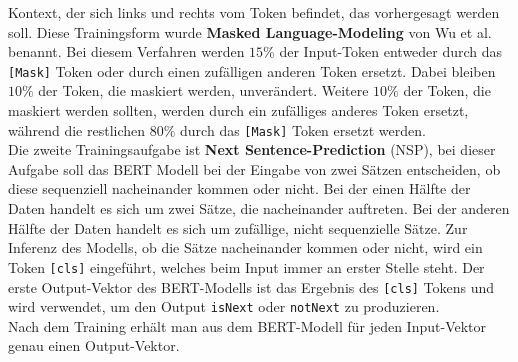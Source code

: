 \documentclass[12pt,letterpaper,ngerman]{article}
\begin{document}
Kontext, der sich links und rechts vom Token befindet, das vorhergesagt
werden soll.
Diese Trainingsform wurde {\bf Masked Language-Modeling} von 
Wu et al. benannt.
Bei diesem Verfahren werden $15 \%$ der Input-Token entweder durch 
das \verb|[Mask]| Token oder durch einen zufälligen anderen 
Token ersetzt.
Dabei bleiben $10 \%$ der Token, die maskiert werden,
unverändert. Weitere $10 \%$ der Token, die maskiert werden sollten,
werden durch ein zufälliges anderes Token ersetzt, während die
restlichen $80 \%$ durch das \verb|[Mask]| Token ersetzt werden.\\
Die zweite Trainingsaufgabe ist {\bf Next Sentence-Prediction} (NSP),
bei dieser Aufgabe soll das BERT Modell bei der Eingabe von zwei Sätzen 
entscheiden, ob diese sequenziell nacheinander kommen oder nicht.
Bei der einen Hälfte der Daten handelt es sich um zwei Sätze, die nacheinander 
auftreten. Bei der anderen Hälfte der Daten handelt es sich um zufällige,
nicht sequenzielle Sätze. Zur Inferenz des Modells, ob die Sätze
nacheinander kommen oder nicht, wird ein Token \verb|[cls]| 
eingeführt, welches beim Input immer an erster Stelle steht.
Der erste Output-Vektor des BERT-Modells ist das Ergebnis des
\verb|[cls]| Tokens und wird verwendet, um den Output
\verb|isNext| oder \verb|notNext| zu produzieren.\\
Nach dem Training erhält man aus dem BERT-Modell für jeden 
Input-Vektor genau einen Output-Vektor. 
\end{document}
